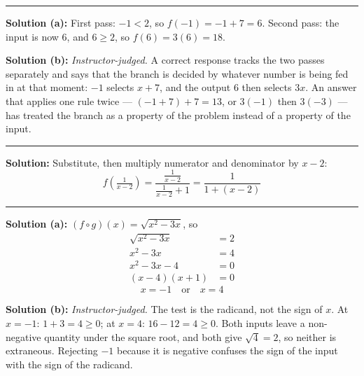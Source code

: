 \documentclass[12pt]{article}
\begin{document}
\vspace{0.1cm}\noindent\rule{\linewidth}{0.2pt}


\textbf{Solution (a):} First pass: $-1 < 2$, so $f(-1) = -1 + 7 = 6$. Second pass: the input is now $6$, and $6 \geq 2$, so $f(6) = 3(6) = 18$. 

\textbf{Solution (b):} \emph{Instructor-judged.} A correct response tracks the two passes separately and says that the branch is decided by whatever number is being fed in at that moment: $-1$ selects $x + 7$, and the output $6$ then selects $3x$. An answer that applies one rule twice --- $(-1 + 7) + 7 = 13$, or $3(-1)$ then $3(-3)$ --- has treated the branch as a property of the problem instead of a property of the input.

\vspace{0.1cm}\noindent\rule{\linewidth}{0.2pt}


\textbf{Solution:} Substitute, then multiply numerator and denominator by $x - 2$:
\[ f\!\left(\tfrac{1}{x-2}\right) = \frac{\tfrac{1}{x-2}}{\tfrac{1}{x-2} + 1}
   = \frac{1}{1 + (x - 2)} \]

\vspace{0.1cm}\noindent\rule{\linewidth}{0.2pt}


\textbf{Solution (a):} $(f \circ g)(x) = \sqrt{x^{2} - 3x}$, so
\begin{align*}
  \sqrt{x^{2} - 3x} &= 2 \\
  x^{2} - 3x &= 4 \\
  x^{2} - 3x - 4 &= 0 \\
  (x - 4)(x + 1) &= 0
\end{align*}
\[ \boxed{x = -1 \quad \text{or} \quad x = 4} \]

\textbf{Solution (b):} \emph{Instructor-judged.} The test is the radicand, not the sign of $x$. At $x = -1$: $1 + 3 = 4 \geq 0$; at $x = 4$: $16 - 12 = 4 \geq 0$. Both inputs leave a non-negative quantity under the square root, and both give $\sqrt{4} = 2$, so neither is extraneous. Rejecting $-1$ because it is negative confuses the sign of the input with the sign of the radicand.
\end{document}
